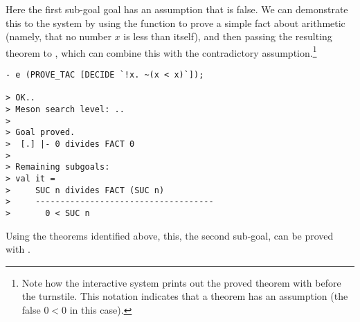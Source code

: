     Here the first sub-goal goal has an assumption that is false.  We
    can demonstrate this to the system by using the 
    function to prove a simple fact about arithmetic (namely, that no
    number $x$ is less than itself), and then passing the resulting
    theorem to , which can combine this with the
    contradictory assumption.\footnote{Note how the interactive system
      prints out the proved theorem with \ml{[.]} before the
      turnstile.  This notation indicates that a theorem has an
    assumption (the false $0 < 0$ in this case).}

\begin{session}\begin{verbatim}
- e (PROVE_TAC [DECIDE `!x. ~(x < x)`]);

> OK..
> Meson search level: ..
>
> Goal proved.
>  [.] |- 0 divides FACT 0
>
> Remaining subgoals:
> val it =
>     SUC n divides FACT (SUC n)
>     ------------------------------------
>       0 < SUC n
\end{verbatim}\end{session}
Using the theorems identified above, this, the second sub-goal, can
be proved with .


